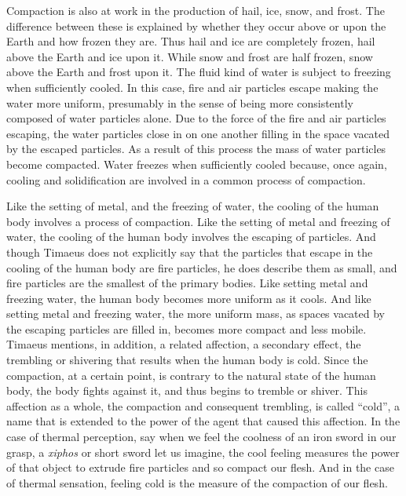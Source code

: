 Compaction is also at work in the production of hail, ice, snow, and frost. The difference between these is explained by whether they occur above or upon the Earth and how frozen they are. Thus hail and ice are completely frozen, hail above the Earth and ice upon it. While snow and frost are half frozen, snow above the Earth and frost upon it. The fluid kind of water is subject to freezing when sufficiently cooled. In this case, fire and air particles escape making the water more uniform, presumably in the sense of being more consistently composed of water particles alone. Due to the force of the fire and air particles escaping, the water particles close in on one another filling in the space vacated by the escaped particles. As a result of this process the mass of water particles become compacted. Water freezes when sufficiently cooled because, once again, cooling and solidification are involved in a common process of compaction.


Like the setting of metal, and the freezing of water, the cooling of the human body involves a process of compaction. Like the setting of metal and freezing of water, the cooling of the human body involves the escaping of particles. And though Timaeus does not explicitly say that the particles that escape in the cooling of the human body are fire particles, he does describe them as small, and fire particles are the smallest of the primary bodies. Like setting metal and freezing water, the human body becomes more uniform as it cools. And like setting metal and freezing water, the more uniform mass, as spaces vacated by the escaping particles are filled in, becomes more compact and less mobile. Timaeus mentions, in addition, a related affection, a secondary effect, the trembling or shivering that results when the human body is cold. Since the compaction, at a certain point, is contrary to the natural state of the human body, the body fights against it, and thus begins to tremble or shiver. This affection as a whole, the compaction and consequent trembling, is called ``cold'', a name that is extended to the power of the agent that caused this affection. In the case of thermal perception, say when we feel the coolness of an iron sword in our grasp, a \emph{xiphos} or short sword let us imagine, the cool feeling measures the power of that object to extrude fire particles and so compact our flesh. And in the case of thermal sensation, feeling cold is the measure of the compaction of our flesh.

